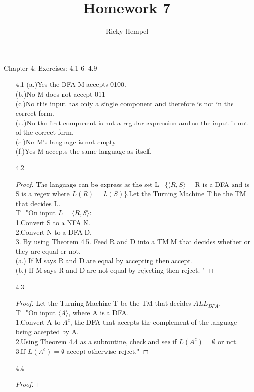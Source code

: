 \documentclass[10pt] {article}
\title{Homework 7 }
\author{Ricky Hempel}
\begin{document}
\maketitle
\begin{center}
Chapter 4: Exercises: 4.1-6, 4.9
\end{center}
\begin{enumerate}
\item[4.1]
(a.)Yes the DFA M accepts 0100.\\
(b.)No M does not accept 011.\\
(c.)No this input has only a single component and therefore is not in the correct form.\\
(d.)No the first component is not a regular expression and so the input is not of the correct form.\\
(e.)No M's language is not empty\\
(f.)Yes M accepts the same language as itself.
\item[4.2]\begin{proof}
The language can be express as the set L=$\{ \langle R,S \rangle\ \mid$ R is a DFA and is S is a regex where $L(R)=L(S)\}$.Let the Turning Machine T be the TM that decides L. \\
T="On input $L=\langle R,S \rangle$:\\
1.Convert S to a NFA N.\\
2.Convert N to a DFA D.\\
3. By using Theorem 4.5. Feed R and D into a TM M that decides whether or they are equal or not.\\
(a.) If M says R and D are equal by accepting then accept.\\
(b.) If M says R and D are not equal by rejecting then reject.  "
\end{proof}
\item[4.3]\begin{proof}
Let the Turning Machine T be the TM that decides $ALL_{DFA}$.\\
T="On input $\langle A \rangle$, where A is a DFA.\\
1.Convert A to $A^c$, the DFA that accepts the complement of the language being accepted by A.\\
2.Using Theorem 4.4 as a subroutine, check and see if $L(A^c)= \emptyset$ or not.\\
3.If $L(A^c)=\emptyset$ accept otherwise reject."
\end{proof}
\item[4.4]\begin{proof}

\end{proof}
\end{enumerate}
\end{document}
